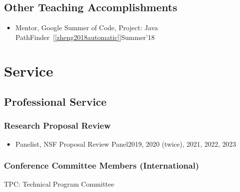 \documentclass[11pt]{article}
\begin{document}
\subsection{Other Teaching Accomplishments}
\begin{itemize}
\item Mentor, Google Summer of Code, Project: Java PathFinder~[\ref{zheng2018automatic}]\hfill Summer'18
\end{itemize}

\section{Service}
\subsection{Professional Service}

\subsubsection{Research Proposal Review}
\begin{itemize}
\item Panelist, NSF Proposal Review Panel\hfill 2019, 2020 (twice), 2021, 2022, 2023
\end{itemize}

\subsubsection{Conference Committee Members (International)}

\begin{description}[before=\small]
\item TPC: Technical Program Committee
\end{description}
\end{document}
